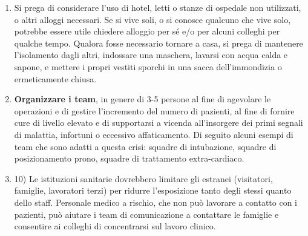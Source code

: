 \documentclass[onecolumn,journal]{IEEEtran}
\begin{document}
\begin{multicols}{2}
\begin{enumerate}
\item Si prega di considerare l’uso di hotel, letti o stanze di ospedale non utilizzati, o altri alloggi necessari. Se si vive soli, o si conosce qualcuno che vive solo, potrebbe essere utile chiedere alloggio per sé e/o per alcuni colleghi per qualche tempo. Qualora fosse necessario tornare a casa, si prega di mantenere l’isolamento dagli altri, indossare una maschera, lavarsi con acqua calda e sapone, e mettere i propri vestiti sporchi in una sacca dell’immondizia o ermeticamente chiusa.

\item \textbf{Organizzare i team}, in genere di 3-5 persone al fine di agevolare le operazioni e di gestire l’incremento del numero di pazienti, al fine di fornire cure di livello elevato e di supportarsi a vicenda all’insorgere dei primi segnali di malattia, infortuni o eccessivo affaticamento. Di seguito alcuni esempi di team che sono adatti a questa crisi: squadre di intubazione, squadre di posizionamento prono, squadre di trattamento extra-cardiaco.

\item 10)	Le istituzioni sanitarie dovrebbero limitare gli estranei (visitatori, famiglie, lavoratori terzi) per ridurre l’esposizione tanto degli stessi quanto dello staff. Personale medico a rischio, che non può lavorare a contatto con i pazienti, può aiutare i team di comunicazione a contattare le famiglie e consentire ai colleghi di concentrarsi sul lavoro clinico.





\end{enumerate}
\end{multicols}
\end{document}
